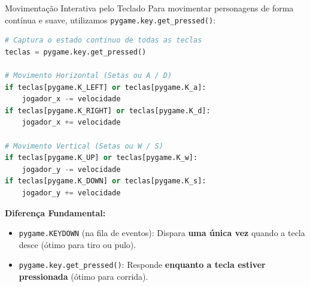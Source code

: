 \begin{frame}[fragile]{Movimentação Interativa pelo Teclado}
    Para movimentar personagens de forma contínua e suave, utilizamos \texttt{pygame.key.get\_pressed()}:

    \begin{lstlisting}[language=Python]
# Captura o estado continuo de todas as teclas
teclas = pygame.key.get_pressed()

# Movimento Horizontal (Setas ou A / D)
if teclas[pygame.K_LEFT] or teclas[pygame.K_a]:
    jogador_x -= velocidade
if teclas[pygame.K_RIGHT] or teclas[pygame.K_d]:
    jogador_x += velocidade

# Movimento Vertical (Setas ou W / S)
if teclas[pygame.K_UP] or teclas[pygame.K_w]:
    jogador_y -= velocidade
if teclas[pygame.K_DOWN] or teclas[pygame.K_s]:
    jogador_y += velocidade
    \end{lstlisting}

    \vspace{0.2cm}
    \textbf{Diferença Fundamental:}
    \begin{itemize}
        \item \texttt{pygame.KEYDOWN} (na fila de eventos): Dispara \textbf{uma única vez} quando a tecla desce (ótimo para tiro ou pulo).
        \item \texttt{pygame.key.get\_pressed()}: Responde \textbf{enquanto a tecla estiver pressionada} (ótimo para corrida).
    \end{itemize}
\end{frame}
